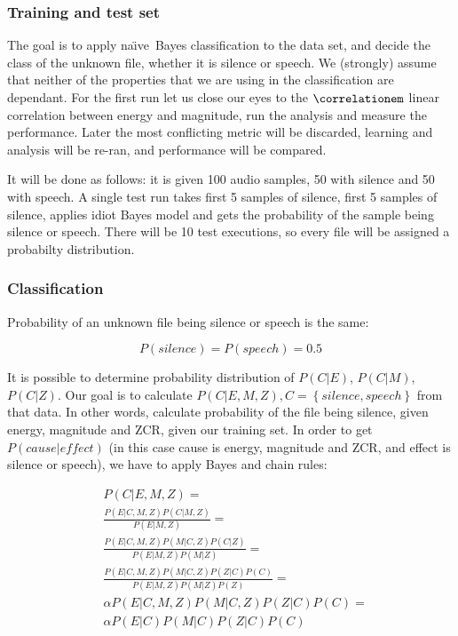 \documentclass[english,11pt]{article}
\newcommand{\naive}{na\"{\i}ve\ }
\numberwithin{equation}{section}
\begin{document}
\subsubsection{Training and test set}

The goal is to apply \naive Bayes classification to the data set, and decide
the class of the unknown file, whether it is silence or speech. We (strongly)
assume that neither of the properties that we are using in the classification
are dependant. For the first run let us close our eyes to the
$\correlationem$ linear correlation between energy and magnitude, run the
analysis and measure the performance. Later the most conflicting metric will be
discarded, learning and analysis will be re-ran, and performance will be
compared.

It will be done as follows: it is given 100 audio samples, 50 with silence and
50 with speech. A single test run takes first 5 samples of silence, first 5
samples of silence, applies idiot Bayes model\cite{idiotbayes} and gets the
probability of the sample being silence or speech. There will be 10 test
executions, so every file will be assigned a probabilty distribution.

\subsubsection{Classification}

Probability of an unknown file being silence or speech is the same:

$$ P(silence) = P(speech) = 0.5 $$

It is possible to determine probability distribution of $P(C|E)$, $P(C|M)$,
$P(C|Z)$. Our goal is to calculate $ P(C | E, M, Z), C = \left\{ silence,
speech \right\}$ from that data. In other words, calculate probability of the
file being silence, given energy, magnitude and ZCR, given our training set. In
order to get $P(cause|effect)$ (in this case cause is energy, magnitude and
ZCR, and effect is silence or speech), we have to apply Bayes and chain rules:

\begin{align}
   & P(C | E, M, Z) = \\
   & \frac{ P(E|C,M,Z) P(C|M,Z) }{ P(E|M,Z) } = \\
   & \frac{ P(E|C,M,Z) P(M|C,Z) P(C|Z) }{ P(E|M,Z) P(M|Z) } = \\
   & \frac{ P(E|C,M,Z) P(M|C,Z) P(Z|C) P(C) }{ P(E|M,Z) P(M|Z) P(Z) } =
    \label{eq:chain_rule} \\
   & \alpha P(E|C,M,Z) P(M|C,Z) P(Z|C) P(C) = \label{eq:alpha} \\
   & \alpha P(E|C) P(M|C) P(Z|C) P(C) \label{eq:independence}
\end{align}
\end{document}
